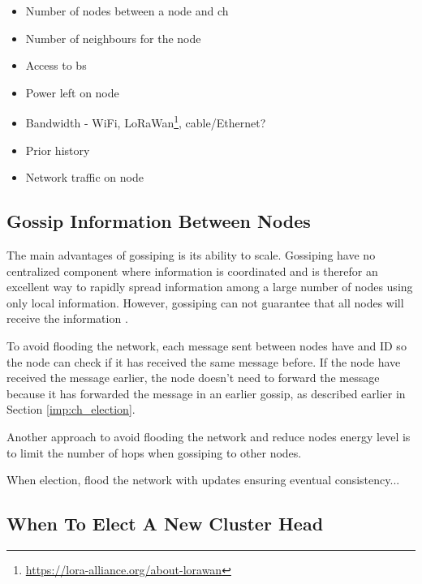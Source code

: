 \documentclass[USenglish]{uit-thesis}
\begin{document}

\begin{itemize}
\item Number of nodes between a node and \gls{ch}
\item Number of neighbours for the node
\item Access to \gls{bs}
\item Power left on node
\item Bandwidth - WiFi, LoRaWan\footnote{\url{https://lora-alliance.org/about-lorawan}}, cable/Ethernet?
\item Prior history
\item Network traffic on node
\end{itemize}



\subsection{Gossip Information Between Nodes}
The main advantages of gossiping is its ability to scale. Gossiping have no centralized component where information is coordinated and is therefor an excellent way to rapidly spread information among a large number of nodes using only local information. However, gossiping can not guarantee that all nodes will receive the information \cite{demers}.

To avoid flooding the network, each message sent between nodes have and ID so the node can check if it has received the same message before. If the node have received the message earlier, the node doesn't need to forward the message because it has forwarded the message in an earlier gossip, as described earlier in Section \ref{imp:ch_election}.

Another approach to avoid flooding the network and reduce nodes energy level is to limit the number of hops when gossiping to other nodes.

When election, flood the network with updates ensuring eventual consistency...

\subsection{When To Elect A New Cluster Head}
\end{document}
